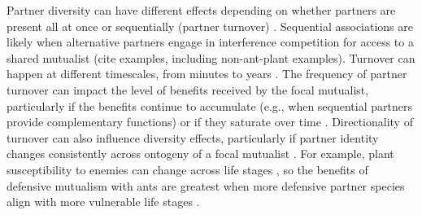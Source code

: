 \documentclass[11pt]{article}
\begin{document}
Partner diversity can have different effects depending on whether partners are present all at once or sequentially (partner turnover) \citep{Djieto-Lordon2005, Ness2006, Bruna2014}. 
Sequential associations are likely when alternative partners engage in interference competition for access to a shared mutualist (cite examples, including non-ant-plant examples). 
Turnover can happen at different timescales, from minutes to years \citep{Oliveira1999,Horvitz1986}. 
The frequency of partner turnover can impact the level of benefits received by the focal mutualist, particularly if the benefits continue to accumulate (e.g., when sequential partners provide complementary functions) or if they saturate over time \citep{Sachs2004}.
Directionality of turnover can also influence diversity effects, particularly if partner identity changes consistently across ontogeny of a focal mutualist \citep{Fonseca2003}.
For example, plant susceptibility to enemies can change across life stages \citep{Boege2005,Barton2010}, so the benefits of defensive mutualism with ants are greatest when more defensive partner species align with more vulnerable life stages \citep{Djieto-Lordon2005}.
\end{document}
